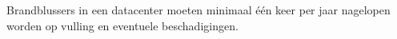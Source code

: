 Brandblussers in een datacenter moeten minimaal \'e\'en keer per jaar nagelopen worden op vulling en eventuele beschadigingen.

